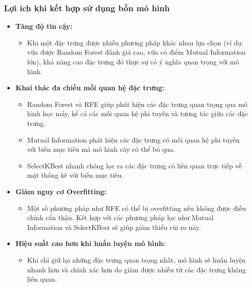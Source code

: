 \documentclass[13pt]{article}
\begin{document}
\subsubsection{Lợi ích khi kết hợp sử dụng bốn mô hình}
\begin{itemize}
    \item \textbf{Tăng độ tin cậy:}
    \begin{itemize}
        \item Khi một đặc trưng được nhiều phương pháp khác nhau lựa chọn (ví dụ: vừa được Random Forest đánh giá cao, vừa có điểm Mutual Information lớn), khả năng cao đặc trưng đó thực sự có ý nghĩa quan trọng với mô hình.
    \end{itemize}
    \item \textbf{Khai thác đa chiều mối quan hệ đặc trưng:}
    \begin{itemize}
        \item Random Forest và RFE giúp phát hiện các đặc trưng quan trọng qua mô hình học máy, kể cả các mối quan hệ phi tuyến và tương tác giữa các đặc trưng.
        \item Mutual Information phát hiện các đặc trưng có mối quan hệ phi tuyến với biến mục tiêu mà mô hình cây có thể bỏ qua.
        \item SelectKBest nhanh chóng lọc ra các đặc trưng có liên quan trực tiếp về mặt thống kê với biến mục tiêu.
    \end{itemize}
    \item \textbf{Giảm nguy cơ Overfitting:}
    \begin{itemize}
        \item Một số phương pháp như RFE có thể bị overfitting nếu không được điều chỉnh cẩn thận. Kết hợp với các phương pháp lọc như Mutual Information và SelectKBest sẽ giúp giảm thiểu rủi ro này.
    \end{itemize}
    \item \textbf{Hiệu suất cao hơn khi huấn luyện mô hình:}
    \begin{itemize}
        \item Khi chỉ giữ lại những đặc trưng quan trọng nhất, mô hình sẽ huấn luyện nhanh hơn và chính xác hơn do giảm được nhiễu từ các đặc trưng không liên quan.
    \end{itemize}
\end{itemize}
\end{document}
